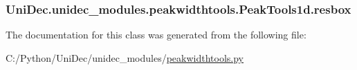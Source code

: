 \subsubsection[{resbox}]{\setlength{\rightskip}{0pt plus 5cm}Uni\+Dec.\+unidec\+\_\+modules.\+peakwidthtools.\+Peak\+Tools1d.\+resbox}\label{class_uni_dec_1_1unidec__modules_1_1peakwidthtools_1_1_peak_tools1d_a3cf33230e20912f5562357da2ec79d1d}


The documentation for this class was generated from the following file\+:\begin{DoxyCompactItemize}
\item 
C\+:/\+Python/\+Uni\+Dec/unidec\+\_\+modules/\hyperlink{peakwidthtools_8py}{peakwidthtools.\+py}\end{DoxyCompactItemize}
